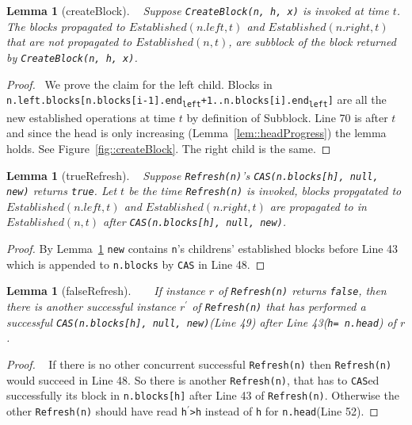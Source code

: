 \documentclass[10pt]{article}
\newtheorem{lemma}[theorem]{Lemma}
\theoremstyle{definition}
\begin{document}
\begin{lemma}[createBlock] \label{lem::createBlock}
  Suppose \texttt{CreateBlock(n, h, x)} is invoked at time $t$. The blocks propagated to $Established(n.left, t)$ and $Established(n.right, t)$ that are not propagated to $Established(n, t)$, are subblock of the block returned by \texttt{CreateBlock(n, h, x)}.
\end{lemma}
\begin{proof}
 We prove the claim for the left child. Blocks in \texttt{n.left.blocks[n.blocks[i-1].end\textsubscript{left}+1..n.blocks[i].end\textsubscript{left}]} are all the new established operations at time $t$ by definition of Subblock. Line 70 is after $t$ and since the head is only increasing (Lemma~\ref{lem::headProgress}) the lemma holds. See Figure~\ref{fig::createBlock}. The right child is the same.
\end{proof}

\begin{lemma}[trueRefresh] \label{lem::trueRefresh}
  Suppose \texttt{Refresh(n)}'s \texttt{CAS(n.blocks[h], null, new)} returns \texttt{true}. Let $t$ be the time \texttt{Refresh(n)} is invoked, blocks propgatated to $Established(n.left, t)$ and $Established(n.right, t)$ are propagated to in $Established(n, t)$ after \texttt{CAS(n.blocks[h], null, new)}.
\end{lemma}
\begin{proof}
By Lemma~\ref{lem::createBlock} \texttt{new} contains \texttt{n}'s childrens' established blocks before Line 43 which is  appended to \texttt{n.blocks} by \texttt{CAS} in Line 48.
\end{proof}

\begin{lemma}[falseRefresh] \label{lem:falseRefresh}
    If instance $r$ of \texttt{Refresh(n)} returns \texttt{false}, then there is another successful instance $r^\prime$ of \texttt{Refresh(n)} that has performed a successful \texttt{CAS(n.blocks[h], null, new)}(Line 49) after Line 43(\texttt{h= n.head}) of $r$.
\end{lemma}
\begin{proof}
  If there is no other concurrent successful \texttt{Refresh(n)} then \texttt{Refresh(n)} would succeed in Line 48. So there is another \texttt{Refresh(n)}, that has to \texttt{CAS}ed successfully its block in \texttt{n.blocks[h]} after Line 43 of \texttt{Refresh(n)}. Otherwise the other \texttt{Refresh(n)} should have read \texttt{h$^\prime$>h} instead of \texttt{h} for \texttt{n.head}(Line 52).
\end{proof}
\end{document}
